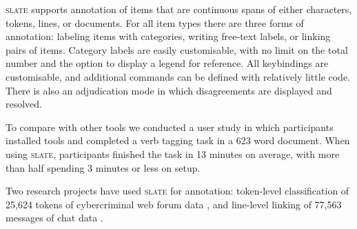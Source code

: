 \documentclass[11pt,a4paper]{article}
\newcommand\Slate{\textsc{slate}\xspace}
\newcommand\slate{\textsc{slate}\xspace}
\begin{document}
\Slate supports annotation of items that are continuous spans of either characters, tokens, lines, or documents.
For all item types there are three forms of annotation: labeling items with categories, writing free-text labels, or linking pairs of items.
Category labels are easily customisable, with no limit on the total number and the option to display a legend for reference.
All keybindings are customisable, and additional commands can be defined with relatively little code.
There is also an adjudication mode in which disagreements are displayed and resolved.

To compare with other tools we conducted a user study in which participants installed tools and completed a verb tagging task in a 623 word document.
When using \slate, participants finished the task in 13 minutes on average, with more than half spending 3 minutes or less on setup.

Two research projects have used \slate for annotation:
token-level classification of 25,624 tokens of cybercriminal web forum data \citep{www17forums},
and line-level linking of 77,563 messages of chat data \citep{acl19disentangle}.
\end{document}
